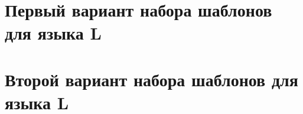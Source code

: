 \appendix
\section{Первый вариант набора шаблонов для языка L}
\label{app:1}


\newpage

\section{Второй вариант набора шаблонов для языка L}
\label{app:2}

